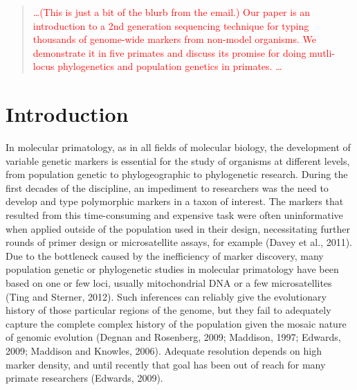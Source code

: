 \documentclass[12pt]{article}
\begin{document}
\maketitle

\begin{abstract}
\textcolor{red}{\ldots (This is just a bit of the blurb from the email.) Our paper is an introduction to a 2nd generation sequencing technique for typing thousands of genome-wide markers from non-model organisms.  We demonstrate it in five primates and discuss its promise for doing mutli-locus phylogenetics and population genetics in primates. \ldots}
\end{abstract}

\section{Introduction}

In molecular primatology, as in all fields of molecular biology, the development of variable genetic markers is essential for the study of organisms at different levels, from population genetic to phylogeographic to phylogenetic research. During the first decades of the discipline, an impediment to researchers was the need to develop and type polymorphic markers in a taxon of interest. The markers that resulted from this time-consuming and expensive task were often uninformative when applied outside of the population used in their design, necessitating further rounds of primer design or microsatellite assays, for example (Davey et al., 2011). Due to the bottleneck caused by the inefficiency of marker discovery, many population genetic or phylogenetic studies in molecular primatology have been based on one or few loci, usually mitochondrial DNA or a few microsatellites (Ting and Sterner, 2012). Such inferences can reliably give the evolutionary history of those particular regions of the genome, but they fail to adequately capture the complete complex history of the population given the mosaic nature of genomic evolution (Degnan and Rosenberg, 2009; Maddison, 1997; Edwards, 2009; Maddison and Knowles, 2006). Adequate resolution depends on high marker density, and until recently that goal has been out of reach for many primate researchers (Edwards, 2009).
\end{document}
